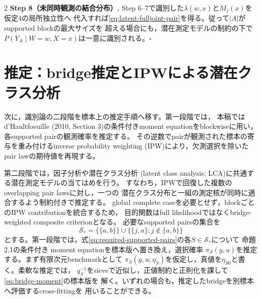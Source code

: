 \documentclass[a4paper,10pt]{article}
\begin{document}
\begin{multicols}{2}
\noindent\textbf{Step 8（未同時観測の結合分布）.}
Step 6--7で識別した$\lambda(w,x)$と$M_j(x)$を仮定4の局所独立性へ
代入すれば\eqref{eq:latent-fulljoint-pair}を得る。従って$|A|$が
supported blockの最大サイズを
超える場合にも，潜在測定モデルの制約の下で
$P(Y_A\mid W=w,X=x)$は一意に識別される。\hfill$\square$

\section{推定：bridge推定とIPWによる潜在クラス分析}
次に，識別論の二段階を標本上の推定手順へ移す。第一段階では，
本稿ではd'Haultfoeuille (2010, Section 3)の条件付きmoment equationをblockwiseに用い，
各supported pairの観測確率を推定する。
その逆数でpairが観測された標本の寄与を重み付けるinverse probability weighting
(IPW)により，欠測選択を除いたpair lawの期待値を再現する。

第二段階では，因子分析や潜在クラス分析
(latent class analysis; LCA)に共通する潜在測定モデルの当てはめを行う。
すなわち，IPWで回復した複数のoverlapping pair lawsに対し，一つの
潜在クラス分布と一組の測定核が同時に適合するよう制約付きで推定する。
global complete caseを必要とせず，blockごとのIPW contributionを統合するため，
目的関数はfull likelihoodではなくbridge-weighted composite criterionとなる。
必要なsupported pairsの集合を
\begin{equation}
\mathcal S_*=\{\{a,b\}\}\cup
\{\{j,a\}:j\notin\{a,b\}\}
\label{eq:required-supported-pairs}
\end{equation}
とする。第一段階では，式\eqref{eq:required-supported-pairs}の各$S\in\mathcal S_*$について
命題2.1の条件付き
moment equationを標本版へ置き換え，選択確率
$\pi_S(y,u)$を推定する。まず有限次元benchmarkとして
$\pi_S(y,u;\eta_S)$を仮定し，真値を$\eta_{S0}$と書く。柔軟な推定では，
$q_S^{-1}$をsieveで近似し，正値制約と正則化を課して\eqref{eq:bridge-moment}の標本版を
解く。いずれの場合も，推定したbridgeを別標本へ評価するcross-fittingを
用いることができる。


\end{multicols}
\end{document}
